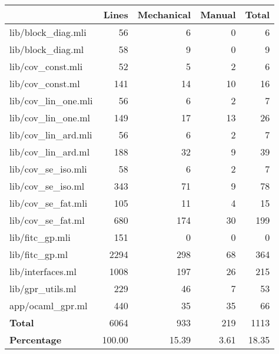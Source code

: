 \begin{tabular}{lrrrr}
  \hline
  & Lines & Mechanical & Manual & \textbf{Total} \\
  \hline
  lib/block\_diag.mli & 56 & 6 & 0 & 6 \\
  lib/block\_diag.ml & 58 & 9 & 0 & 9 \\
  lib/cov\_const.mli & 52 & 5 & 2 & 6 \\
  lib/cov\_const.ml & 141 & 14 & 10 & 16 \\
  lib/cov\_lin\_one.mli & 56 & 6 & 2 & 7 \\
  lib/cov\_lin\_one.ml & 149 & 17 & 13 & 26 \\
  lib/cov\_lin\_ard.mli & 56 & 6 & 2 & 7 \\
  lib/cov\_lin\_ard.ml & 188 & 32 & 9 & 39 \\
  lib/cov\_se\_iso.mli & 58 & 6 & 2 & 7 \\
  lib/cov\_se\_iso.ml & 343 & 71 & 9 & 78 \\
  lib/cov\_se\_fat.mli & 105 & 11 & 4 & 15 \\
  lib/cov\_se\_fat.ml & 680 & 174 & 30 & 199 \\
  lib/fitc\_gp.mli & 151 & 0 & 0 & 0 \\
  lib/fitc\_gp.ml & 2294 & 298 & 68 & 364 \\
  lib/interfaces.ml & 1008 & 197 & 26 & 215 \\
  lib/gpr\_utils.ml & 229 & 46 & 7 & 53 \\
  app/ocaml\_gpr.ml & 440 & 35 & 35 & 66 \\
  \hline
  \textbf{Total} & 6064 & 933 & 219 & 1113 \\
  \textbf{Percentage} & 100.00 & 15.39 & 3.61 & 18.35 \\
  \hline
  \end{tabular}
